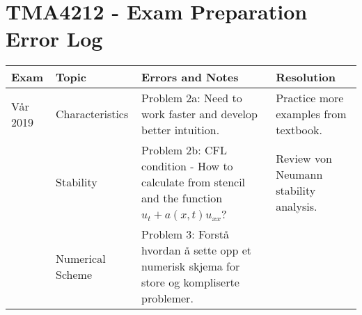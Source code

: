 
\section*{TMA4212 - Exam Preparation Error Log}

\renewcommand{\arraystretch}{1.2}
\begin{tabular}{|p{2cm}|p{2.5cm}|p{7cm}|p{4cm}|}
\hline
\textbf{Exam} & \textbf{Topic} & \textbf{Errors and Notes} & \textbf{Resolution} \\
\hline
Vår 2019 & Characteristics & Problem 2a: Need to work faster and develop better intuition. & Practice more examples from textbook. \\
& Stability & Problem 2b: CFL condition - How to calculate from stencil and the function $u_t + a(x,t)u_{xx}$? & Review von Neumann stability analysis. \\
 & Numerical Scheme & Problem 3: Forstå hvordan å sette opp et numerisk skjema for store og kompliserte problemer. & &\\
\hline

\end{tabular}
